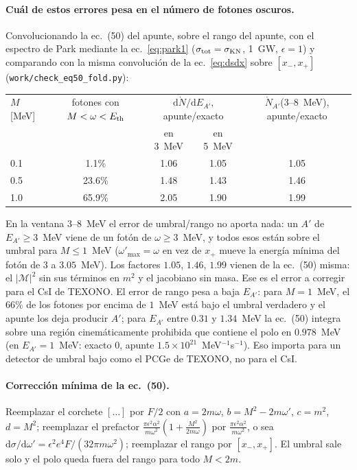 \documentclass[11pt,a4paper]{article}
\newcommand{\Ap}{A'}
\newcommand{\eps}{\epsilon}
\newcommand{\KN}{\mathrm{KN}}
\newcommand{\dd}{\mathrm{d}}
\begin{document}
\paragraph{Cuál de estos errores pesa en el número de fotones oscuros.} Convolucionando la ec.~(50) del apunte, sobre el
rango del apunte, con el espectro de Park mediante la ec.~\eqref{eq:park1} ($\sigma_{\rm tot}=\sigma_\KN$, 1~GW, $\eps=1$) y
comparando con la misma convolución de la ec.~\eqref{eq:dsdx} sobre $[x_-,x_+]$ (\texttt{work/check\_eq50\_fold.py}):
\begin{center}\small
\begin{tabular}{@{}lcccc@{}}
\toprule
$M$ [MeV] & fotones con $M<\omega<E_{\rm th}$ & \multicolumn{2}{c}{$\dd\dot N/\dd E_{\Ap}$, apunte/exacto} & $\dot N_{\Ap}$(3--8~MeV), apunte/exacto\\
 & & en 3~MeV & en 5~MeV & \\
\midrule
0.1 & 1.1\% & 1.06 & 1.05 & 1.05\\
0.5 & 23.6\% & 1.48 & 1.43 & 1.46\\
1.0 & 65.9\% & 2.05 & 1.90 & 1.99\\
\bottomrule
\end{tabular}
\end{center}
En la ventana 3--8~MeV el error de umbral/rango no aporta nada: un $\Ap$ de $E_{\Ap}\ge3$~MeV viene de un fotón de
$\omega\ge3$~MeV, y todos esos están sobre el umbral para $M\le1$~MeV ($\omega'_{\max}=\omega$ en vez de $x_+$ mueve la
energía mínima del fotón de $3$ a $3.05$~MeV). Los factores $1.05$, $1.46$, $1.99$ vienen de la ec.~(50) misma: el
$|\mathcal M|^2$ sin sus términos en $m^2$ y el jacobiano sin masa. Ese es el error a corregir para el CsI de TEXONO.
El error de rango pesa a baja $E_{\Ap}$: para $M=1$~MeV, el $66\%$ de los fotones por encima de $1$~MeV está bajo el
umbral verdadero y el apunte los deja producir $\Ap$; para $E_{\Ap}$ entre $0.31$ y $1.34$~MeV la ec.~(50) integra sobre
una región cinemáticamente prohibida que contiene el polo en $0.978$~MeV (en $E_{\Ap}=1$~MeV: exacto $0$, apunte
$1.5\times10^{21}$~MeV$^{-1}$s$^{-1}$). Eso importa para un detector de umbral bajo como el PCGe de TEXONO, no para el CsI.

\paragraph{Corrección mínima de la ec.~(50).} Reemplazar el corchete $[\ldots]$ por $F/2$ con $a=2m\omega$,
$b=M^2-2m\omega'$, $c=m^2$, $d=M^2$; reemplazar el prefactor $\frac{\pi\eps^2\alpha^2}{m\omega^2}(1+\frac{M^2}{2m\omega})$
por $\frac{\pi\eps^2\alpha^2}{m\omega^2}$, o sea $\dd\sigma/\dd\omega'=\eps^2e^4F/(32\pi m\omega^2)$; reemplazar el rango
por $[x_-,x_+]$. El umbral sale solo y el polo queda fuera del rango para todo $M<2m$.
\end{document}
